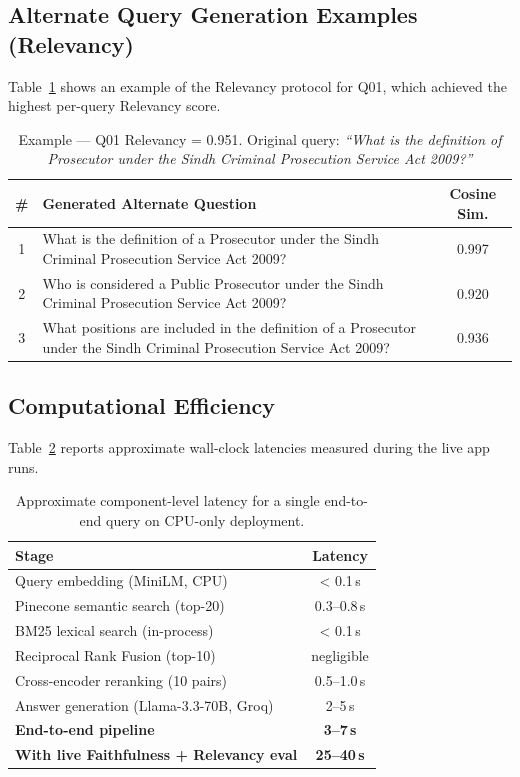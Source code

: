 \documentclass[11pt,a4paper]{article}
\begin{document}
\subsection{Alternate Query Generation Examples (Relevancy)}

Table~\ref{tab:relq01} shows an example of the Relevancy protocol for Q01, which achieved the highest per-query Relevancy score.

\begin{table}[H]
\centering
\footnotesize
\caption{Example --- Q01 Relevancy = 0.951. Original query: \emph{``What is the definition of Prosecutor under the Sindh Criminal Prosecution Service Act 2009?''}}
\label{tab:relq01}
\renewcommand{\arraystretch}{1.25}
\begin{tabularx}{\textwidth}{@{}c >{\RaggedRight\arraybackslash}X c@{}}
\toprule
\textbf{\#} & \textbf{Generated Alternate Question} & \textbf{Cosine Sim.} \\
\midrule
1 & What is the definition of a Prosecutor under the Sindh Criminal Prosecution Service Act 2009? & 0.997 \\
2 & Who is considered a Public Prosecutor under the Sindh Criminal Prosecution Service Act 2009? & 0.920 \\
3 & What positions are included in the definition of a Prosecutor under the Sindh Criminal Prosecution Service Act 2009? & 0.936 \\
\bottomrule
\end{tabularx}
\end{table}

\subsection{Computational Efficiency}

Table~\ref{tab:latency} reports approximate wall-clock latencies measured during the live app runs.

\begin{table}[H]
\centering
\footnotesize
\caption{Approximate component-level latency for a single end-to-end query on CPU-only deployment.}
\label{tab:latency}
\renewcommand{\arraystretch}{1.25}
\begin{tabular}{lc}
\toprule
\textbf{Stage} & \textbf{Latency} \\
\midrule
Query embedding (MiniLM, CPU)            & \textless{} 0.1\,s \\
Pinecone semantic search (top-20)        & 0.3--0.8\,s \\
BM25 lexical search (in-process)         & \textless{} 0.1\,s \\
Reciprocal Rank Fusion (top-10)          & negligible \\
Cross-encoder reranking (10 pairs)       & 0.5--1.0\,s \\
Answer generation (Llama-3.3-70B, Groq)  & 2--5\,s \\
\midrule
\textbf{End-to-end pipeline}             & \textbf{3--7\,s} \\
\textbf{With live Faithfulness + Relevancy eval} & \textbf{25--40\,s} \\
\bottomrule
\end{tabular}
\end{table}
\end{document}
